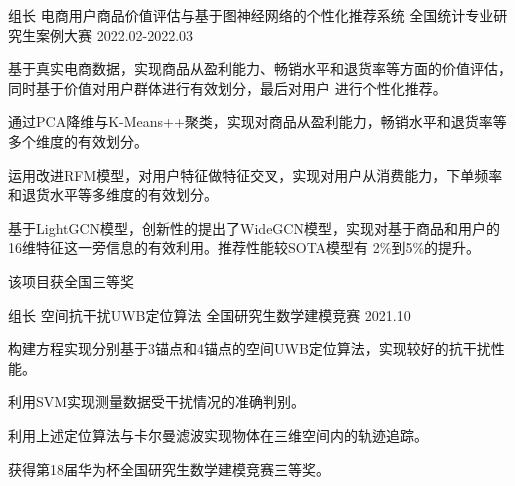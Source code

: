 \begin{cventries}
\cventry
{组长} %
{电商用户商品价值评估与基于图神经网络的个性化推荐系统} %
{全国统计专业研究生案例大赛} %
{2022.02-2022.03} %
{
  \begin{cvitems} %
    \item {基于真实电商数据，实现商品从盈利能力、畅销水平和退货率等方面的价值评估，同时基于价值对用户群体进行有效划分，最后对用户
    进行个性化推荐。}
    \item {通过PCA降维与K-Means++聚类，实现对商品从盈利能力，畅销水平和退货率等多个维度的有效划分。}
    \item {运用改进RFM模型，对用户特征做特征交叉，实现对用户从消费能力，下单频率和退货水平等多维度的有效划分。}
    \item {基于LightGCN模型，创新性的提出了WideGCN模型，实现对基于商品和用户的16维特征这一旁信息的有效利用。推荐性能较SOTA模型有
    2\%到5\%的提升。}
    \item {该项目获全国三等奖}
  \end{cvitems}
}

\cventry
{组长} %
{空间抗干扰UWB定位算法} %
{全国研究生数学建模竞赛} %
{2021.10} %
{
  \begin{cvitems} %
    \item {构建方程实现分别基于3锚点和4锚点的空间UWB定位算法，实现较好的抗干扰性能。}
    \item {利用SVM实现测量数据受干扰情况的准确判别。}
    \item {利用上述定位算法与卡尔曼滤波实现物体在三维空间内的轨迹追踪。}
    \item {获得第18届华为杯全国研究生数学建模竞赛三等奖。}
  \end{cvitems}
}

\end{cventries}
